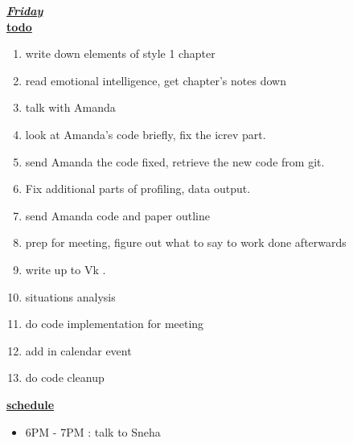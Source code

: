 \underline{\textbf{\textit{Friday}}}\\
\underline{\textbf{todo}}\\
\begin{enumerate}
\item write down elements of style 1 chapter 
\item read emotional intelligence, get chapter's notes down 
\item talk with Amanda

\item look at Amanda's code briefly, fix the icrev part.    
\item send Amanda the code fixed, retrieve the new code from git. 
\item Fix additional parts of profiling, data output. 
\item send Amanda code and paper outline 

\item prep for meeting, figure out what to say to work done afterwards  

\item write up to Vk .

\item situations analysis 

\item do code implementation for meeting 
\item add in calendar event 
\item do code cleanup 
\end{enumerate}

\underline{\textbf{schedule}}\\
\begin{itemize}
\item 6PM - 7PM : talk to Sneha
\end{itemize}

